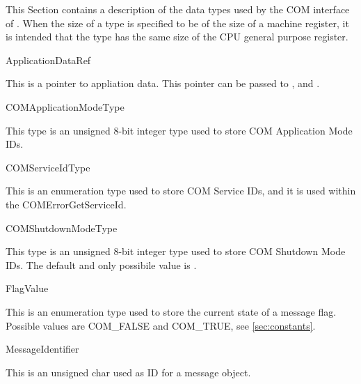 This Section contains a description of the data types used by the COM
interface of \ee. When the size of a type is specified to be of the
size of a machine register, it is intended that the type has the same
size of the CPU general purpose register.

\begin{type}{ApplicationDataRef}
  \begin{typedescription}
    This is a pointer to appliation data. This pointer can be passed to 
    ,  and .  
  \end{typedescription}
\end{type}

\begin{type}{COMApplicationModeType}
  \begin{typedescription}
   This type is an unsigned 8-bit integer type used to store COM Application Mode 
   IDs.
  \end{typedescription}
\end{type}

\begin{type}{COMServiceIdType}
  \begin{typedescription}
    This is an enumeration type used to store COM Service IDs, and it is used 
    within the COMErrorGetServiceId.
  \end{typedescription}
\end{type}

\begin{type}{COMShutdownModeType}
  \begin{typedescription}
    This type is an unsigned 8-bit integer type used to store COM Shutdown Mode 
    IDs. The default and only possibile value is . 
  \end{typedescription}
\end{type}

\begin{type}{FlagValue}
  \begin{typedescription}
    This is an enumeration type used to store the current state of a message flag.
    Possible values are COM_FALSE and COM_TRUE, see \ref{sec:constants}. 
  \end{typedescription}
\end{type}

\begin{type}{MessageIdentifier}
  \begin{typedescription}
    This is an unsigned char used as ID for a message object.
  \end{typedescription}
\end{type}

